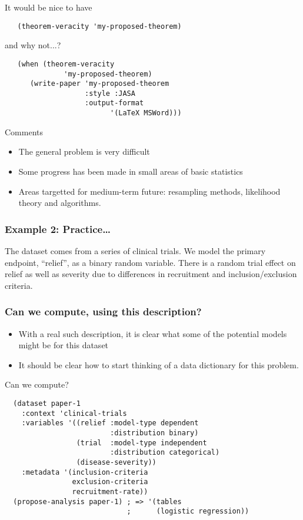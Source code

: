 \documentclass{beamer}
\begin{document}
\begin{frame}[fragile]{It would be nice to have}
\begin{verbatim}
   (theorem-veracity 'my-proposed-theorem)
\end{verbatim}
\end{frame}

\begin{frame}[fragile]{and why not...?}
\begin{verbatim}
   (when (theorem-veracity
              'my-proposed-theorem)
      (write-paper 'my-proposed-theorem
                   :style :JASA
                   :output-format
                         '(LaTeX MSWord)))
\end{verbatim}
\end{frame}

\begin{frame}{Comments}
  \begin{itemize}
  \item The general problem is very difficult
  \item Some progress has been made in small areas of basic statistics
  \item Areas targetted for medium-term future: resampling methods,
    likelihood theory and algorithms.
  \end{itemize}

\end{frame}

\begin{frame}
  \frametitle{Example 2: Practice\ldots} 
  \label{example2}
  The dataset comes from a series of clinical trials.  We model the
  primary endpoint, ``relief'', as a binary random variable.  There is
  a random trial effect on relief as well as severity due to
  differences in recruitment and inclusion/exclusion criteria.
\end{frame}

\begin{frame}
  \frametitle{Can we compute, using this description?}
  \begin{itemize}
  \item With a real such description, it is clear what some of the
    potential models might be for this dataset
  \item It should be clear how to start thinking of a data dictionary
    for this problem.
  \end{itemize}
\end{frame}

\begin{frame}[fragile]{Can we compute?}
\begin{verbatim}
  (dataset paper-1
    :context 'clinical-trials
    :variables '((relief :model-type dependent
                         :distribution binary)
                 (trial  :model-type independent
                         :distribution categorical)
                 (disease-severity))
    :metadata '(inclusion-criteria
                exclusion-criteria
                recruitment-rate))
  (propose-analysis paper-1) ; => '(tables
                             ;      (logistic regression))
\end{verbatim}
\end{frame}
\end{document}
